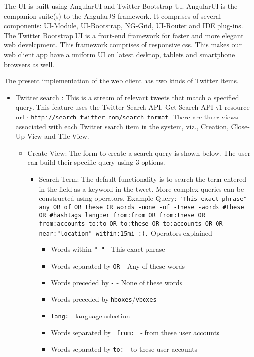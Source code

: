 The UI is built using AngularUI and Twitter Bootstrap UI. AngularUI is the companion suite(s) to the AngularJS framework. It comprises of several components: UI-Module, UI-Bootstrap, NG-Grid, UI-Router and IDE plug-ins. The Twitter Bootstrap UI is a front-end framework for faster and more elegant web development. This framework comprises of responsive css. This makes our web client app have a uniform UI on latest desktop, tablets and smartphone browsers as well.

The present implementation of the web client has two kinds of Twitter Items. 
\begin{itemize}
	\item Twitter search : This is a stream of relevant tweets that match a specified query. This feature uses the Twitter Search API. Get Search API v1 resource url : \texttt{http://search.twitter.com/search.format}. There are three views associated with each Twitter search item in the system, viz., Creation, Close-Up View  and Tile View.
	\begin{itemize}
		\item Create View: The form to create a search query is shown below. The user can build their specific query using 3 options.
		\begin{itemize}
		\item Search Term: The default functionality is to search the term entered in the field as a keyword in the tweet. More complex queries can be constructed using operators. Example Query:\texttt{ "This exact phrase" any OR of OR these OR words -none -of -these -words \#these OR \#hashtags lang:en from:from OR from:these OR from:accounts to:to OR to:these OR to:accounts \@mentioning OR \@these OR \@accounts near:"location" within:15mi :(.} Operators explained
		\begin{itemize}
		\item Words within \texttt{" "} -   This exact phrase
		\item Words separated by \texttt{OR} - Any of these words
		\item Words preceded by \texttt{-} - None of these words
		\item Words preceded by \texttt{hboxes}/\texttt{vboxes}\\
		\item \texttt{lang:} - language selection
		\item Words separated by \texttt{ from: } - from these user accounts 
		\item Words separated by \texttt{to:} - to these user accounts 

\end{itemize}
\end{itemize}
\end{itemize}
\end{itemize}
